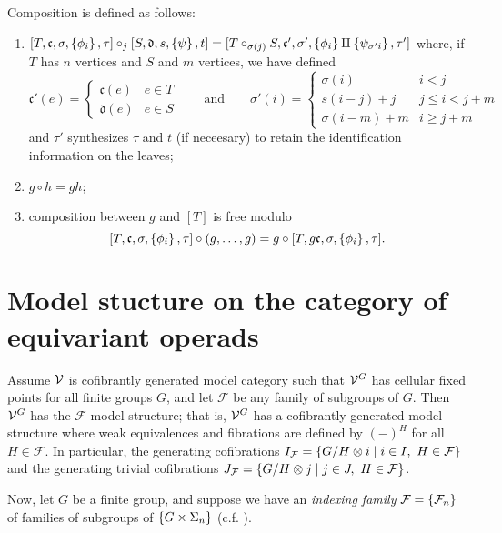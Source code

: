 \documentclass[psamsfonts,oneside,10pt,letterpaper
,draft
]{amsart}%
\renewcommand{\fc}{\ensuremath{\mathfrak{c}}}
\renewcommand{\F}{\mathcal F}
\renewcommand{\1}{\ensuremath{\mathbb{id}}}
\begin{document}
Composition is defined as follows:
\begin{enumerate}
\item $[T,\fc,\sigma,\set{\phi_i},\tau] \circ_j [S,\mathfrak{d}, s, \set{\psi}, t] = [T\circ_{\sigma(j)}S, \fc', \sigma', \set{\phi_i}\amalg\set{\psi_{\sigma' i}}, \tau']$ where, if $T$ has $n$ vertices and $S$ and $m$ vertices, we have defined
      \[
            \fc'(e) = \begin{cases}\fc(e) & e\in T\\ \mathfrak{d}(e) & e\in S\end{cases} \qquad \mbox{and} \qquad 
            \sigma'(i) =
            \begin{cases}
                  \sigma(i) & i< j\\
                  s(i-j)+j & j\leq i < j+m\\
                  \sigma(i-m)+m & i\geq j+m
            \end{cases}
      \]
      and $\tau'$ synthesizes $\tau$ and $t$ (if neceesary) to retain the identification information on the leaves;
\item $g\circ h = gh$;
\item composition between $g$ and $[T]$ is free modulo
      \[
            [T,\fc,\sigma,\set{\phi_i},\tau] \circ (g,\ldots,g) = g\circ [T,g\fc,\sigma,\set{\phi_i}, \tau].
      \]
\end{enumerate}

\newpage
\section{Model stucture on the category of equivariant operads}

\begin{proposition}
      Assume $\mathcal V$ is cofibrantly generated model category such that $\mathcal V^G$ has cellular fixed points for all finite groups $G$, and let $\F$ be any family of subgroups of $G$. Then $\mathcal V^G$ has the $\F$-model structure; that is, $\mathcal V^G$ has a cofibrantly generated model structure where weak equivalences and fibrations are defined by $(-)^H$ for all $H\in \F$. In particular, the generating cofibrations $I_\F = \sets{G/H\otimes i}{i\in I,\ H\in \F}$ and the generating trivial cofibrations $J_\F = \sets{G/H\otimes j}{j\in J,\ H\in \F}$. 
\end{proposition}

Now, let $G$ be a finite group, and suppose we have an {\em indexing family} $\F = \set{\F_n}$ of families of subgroups of $\left\{G\times \Sigma_n\right\}$ (c.f. \cite{BH15}). 
\end{document}
